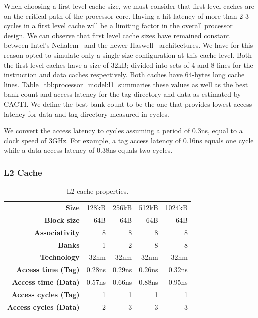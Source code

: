 When choosing a first level cache size, we must consider that first level caches are on the critical path of the processor core.
Having a hit latency of more than 2-3 cycles in a first level cache will be a limiting factor in the overall processor design.
We can observe that first level cache sizes have remained constant between Intel's Nehalem~\cite{Thomadakis2011} and the newer Haswell~\cite{Jain2013} architectures.
We have for this reason opted to simulate only a single size configuration at this cache level.
Both the first level caches have a size of 32kB; divided into sets of 4 and 8 lines for the instruction and data caches respectively. 
Both caches have 64-bytes long cache lines.
Table~\ref{tbl:processor_model:l1} summaries these values as well as the best bank count and access latency for the tag directory and data as estimated by CACTI. 
We define the best bank count to be the one that provides lowest access latency for data and tag directory measured in cycles.

We convert the access latency to cycles assuming a period of 0.3ns, equal to a clock speed of 3GHz.
For example, a tag access latency of 0.16ns equals one cycle while a data access latency of 0.38ns equals two cycles.


\subsubsection{L2 Cache}
\begin{table}[ht]
\centering
\begin{tabular}{rrrrr}
\toprule
\bf{Size}                 & 128kB       & 256kB       & 512kB       & 1024kB            \\
\bf{Block size}           & 64B         & 64B         & 64B         & 64B               \\
\bf{Associativity}        & 8           & 8           & 8           & 8                 \\
\bf{Banks}                & 1           & 2           & 8           & 8                 \\
\bf{Technology}           & 32nm        & 32nm        & 32nm        & 32nm              \\
\bf{Access time (Tag)}    & 0.28ns      & 0.29ns      & 0.26ns      & 0.32ns            \\
\bf{Access time (Data)}   & 0.57ns      & 0.66ns      & 0.88ns      & 0.95ns            \\
\bf{Access cycles (Tag)}  & 1           & 1           & 1           & 1                 \\
\bf{Access cycles (Data)} & 2           & 3           & 3           & 3                 \\
\bottomrule
\end{tabular}
\caption{L2 cache properties.}
\label{tbl:processor_model:l2}
\end{table}

